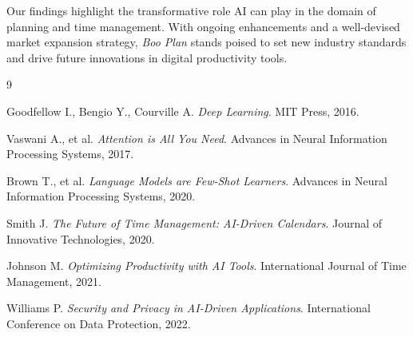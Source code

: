 \documentclass[14pt, english]{gost-7-32} %
\begin{document}
Our findings highlight the transformative role AI can play in the domain of planning and time management. With ongoing enhancements and a well-devised market expansion strategy, \textit{Boo Plan} stands poised to set new industry standards and drive future innovations in digital productivity tools.

\begin{thebibliography}{9}

Goodfellow I., Bengio Y., Courville A.
\textit{Deep Learning}.
MIT Press, 2016.

Vaswani A., et al.
\textit{Attention is All You Need}.
Advances in Neural Information Processing Systems, 2017.

Brown T., et al.
\textit{Language Models are Few-Shot Learners}.
Advances in Neural Information Processing Systems, 2020.

Smith J.
\textit{The Future of Time Management: AI-Driven Calendars}.
Journal of Innovative Technologies, 2020.

Johnson M.
\textit{Optimizing Productivity with AI Tools}.
International Journal of Time Management, 2021.

Williams P.
\textit{Security and Privacy in AI-Driven Applications}.
International Conference on Data Protection, 2022.

\end{thebibliography}
\end{document}
